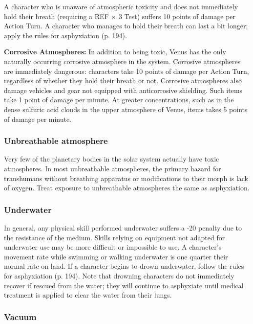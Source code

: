 A character who is unaware of atmospheric toxicity and does not immediately hold their breath (requiring a REF $\times$ 3 Test) suffers 10 points of damage per Action Turn. A character who manages to hold their breath can last a bit longer; apply the rules for asphyxiation (p. 194).

\textbf{Corrosive Atmospheres:} In addition to being toxic, Venus has the only naturally occurring corrosive atmosphere in the system. Corrosive atmospheres are immediately dangerous: characters take 10 points of damage per Action Turn, regardless of whether they hold their breath or not. Corrosive atmospheres also damage vehicles and gear not equipped with anticorrosive shielding. Such items take 1 point of damage per minute. At greater concentrations, such as in the dense sulfuric acid clouds in the upper atmosphere of Venus, items takes 5 points of damage per minute.

\subsubsection{Unbreathable atmosphere}

Very few of the planetary bodies in the solar system actually have toxic atmospheres. In most unbreathable atmospheres, the primary hazard for transhumans without breathing apparatus or modifications to their morph is lack of oxygen. Treat exposure to unbreathable atmospheres the same as asphyxiation.

\subsubsection{Underwater}

In general, any physical skill performed underwater suffers a -20 penalty due to the resistance of the medium. Skills relying on equipment not adapted for underwater use may be more difficult or impossible to use. A character’s movement rate while swimming or walking underwater is one quarter their normal rate on land. If a character begins to drown underwater, follow the rules for asphyxiation (p. 194). Note that drowning characters do not immediately recover if rescued from the water; they will continue to asphyxiate until medical treatment is applied to clear the water from their lungs.

\subsubsection{Vacuum}

